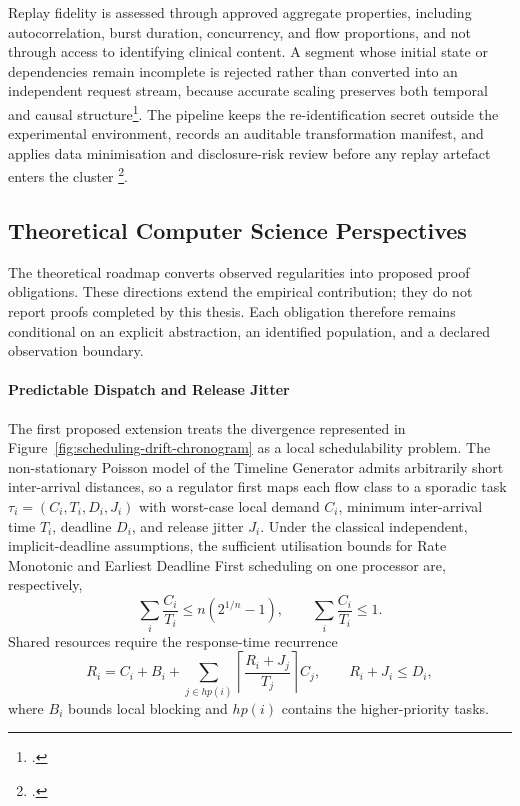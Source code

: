 \noindent Replay fidelity is assessed through approved aggregate properties,
including autocorrelation, burst duration, concurrency, and flow proportions, and not through access to identifying clinical content. A segment
whose initial state or dependencies remain incomplete is rejected rather than
converted into an independent request stream, because accurate scaling preserves
both temporal and causal structure\footcite{zhu-tbbt-trace-replay}. The pipeline
keeps the re-identification secret outside the experimental environment, records
an auditable transformation manifest, and applies data minimisation and
disclosure-risk review before any replay artefact enters the cluster
\footcite{eu-gdpr-2016-679}.

\subsection{Theoretical Computer Science Perspectives}
\label{subsec:future-theoretical-perspectives}

\noindent The theoretical roadmap converts observed regularities into proposed proof obligations. These directions extend the
empirical contribution; they do not report proofs completed by this thesis.
Each obligation therefore remains conditional on an explicit abstraction, an
identified population, and a declared observation boundary.

\paragraph{Predictable Dispatch and Release Jitter}
\noindent The first proposed extension treats the divergence represented in
Figure~\ref{fig:scheduling-drift-chronogram} as a local schedulability problem.
The non-stationary Poisson model of the Timeline Generator admits arbitrarily short inter-arrival
distances, so a regulator first maps each flow class to a sporadic task
$\tau_i=(C_i,T_i,D_i,J_i)$ with worst-case local demand $C_i$, minimum
inter-arrival time $T_i$, deadline $D_i$, and release jitter $J_i$. Under the
classical independent, implicit-deadline assumptions, the sufficient
utilisation bounds for Rate Monotonic and Earliest Deadline First scheduling on
one processor are, respectively,
\[
 \sum_i\frac{C_i}{T_i}\leq n\left(2^{1/n}-1\right),
 \qquad
 \sum_i\frac{C_i}{T_i}\leq1.
\]
Shared resources require the response-time recurrence
\begin{equation}
 R_i=C_i+B_i+\sum_{j\in hp(i)}
       \left\lceil\frac{R_i+J_j}{T_j}\right\rceil C_j,
 \qquad R_i+J_i\leq D_i,
\end{equation}
where $B_i$ bounds local blocking and $hp(i)$ contains the higher-priority
tasks.

